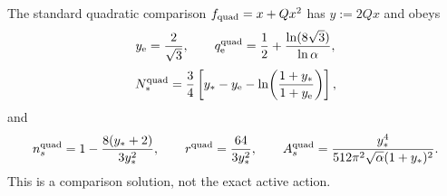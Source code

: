 \documentclass[12pt,a4paper]{article}
\begin{document}
\begin{theorem}
\label{p8:thm:laur27-inflation-closure}
The standard quadratic comparison $f_{\rm quad}=x+Qx^2$ has
$y:=2Qx$ and obeys
\begin{equation}
\label{p8:eq:laur27-starobinsky-end}
 y_{\rm e}=\frac2{\sqrt3},\qquad
 q_{\rm e}^{\rm quad}=\frac12+\frac{\ln(8\sqrt3)}{\ln\alpha},
\end{equation}
\begin{equation}
\label{p8:eq:laur27-starobinsky-N}
 N_*^{\rm quad}=\frac34\left[
 y_*-y_{\rm e}-\ln\!\left(\frac{1+y_*}{1+y_{\rm e}}\right)\right],
\end{equation}
and
\begin{equation}
\label{p8:eq:laur27-starobinsky-observables}
 n_s^{\rm quad}=1-\frac{8(y_*+2)}{3y_*^2},\qquad
 r^{\rm quad}=\frac{64}{3y_*^2},\qquad
 A_s^{\rm quad}=\frac{y_*^4}{512\pi^2\sqrt\alpha(1+y_*)^2}.
\end{equation}
This is a comparison solution, not the exact active action.


\end{theorem}
\end{document}
